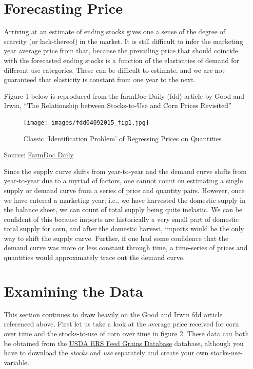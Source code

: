 \documentclass[
]{book}
\begin{document}
\hypertarget{forecasting-price}{%
\section{Forecasting Price}\label{forecasting-price}}

Arriving at an estimate of ending stocks gives one a sense of the degree of scarcity (or lack-thereof) in the market. It is still difficult to infer the marketing year average price from that, because the prevailing price that should coincide with the forecasted ending stocks is a function of the elasticities of demand for different use categories. These can be difficult to estimate, and we are not guaranteed that elasticity is constant from one year to the next.

Figure 1 below is reproduced from the farmDoc Daily (fdd) article by Good and Irwin, ``The Relationship between Stocks-to-Use and Corn Prices Revisited''

\begin{figure}
\centering
\texttt{[image: images/fdd04092015\_fig1.jpg]}
\caption{Classic `Identification Problem' of Regressing Prices on Quantities}
\end{figure}

Source: \href{http://farmdocdaily.illinois.edu/2015/04/relationship-stock-to-use-and-corn-prices.html}{FarmDoc Daily}

Since the supply curve shifts from year-to-year and the demand curve shifts from year-to-year due to a myriad of factors, one cannot count on estimating a single supply or demand curve from a series of price and quantity pairs. However, once we have entered a marketing year; i.e., we have harvested the domestic supply in the balance sheet, we can count of total supply being quite inelastic. We can be confident of this because imports are historically a very small part of domestic total supply for corn, and after the domestic harvest, imports would be the only way to shift the supply curve. Further, if one had some confidence that the demand curve was more or less constant through time, a time-series of prices and quantities would approximately trace out the demand curve.

\hypertarget{examining-the-data}{%
\section{Examining the Data}\label{examining-the-data}}

This section continues to draw heavily on the Good and Irwin fdd article referenced above. First let us take a look at the average price received for corn over time and the stocks-to-use of corn over time in figure 2. These data can both be obtained from the \href{http://www.ers.usda.gov/data-products/feed-grains-database.aspx}{USDA ERS Feed Grains Database} database, although you have to download the \emph{stocks} and \emph{use} separately and create your own stocks-use-variable.
\end{document}
